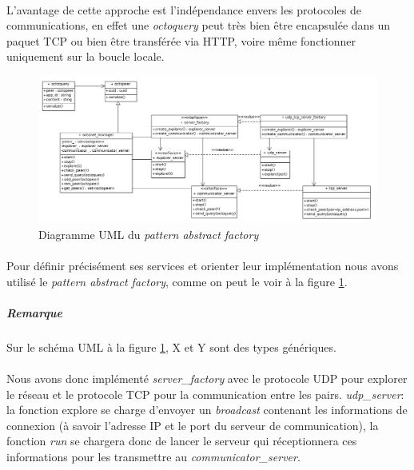 \documentclass[a4paper]{article}
\begin{document}
			\paragraph{}{
			L’avantage de cette approche est l’indépendance envers les protocoles de communications, en effet
			une \textit{octoquery} peut très bien être encapsulée dans un paquet TCP ou bien être transférée via HTTP,
			 voire même fonctionner uniquement sur la boucle locale.
			}
			\begin{figure}[!h]
					\centering
					\includegraphics[scale=0.4]{UML/octonet_factory1.png}
					\caption{\label{factory_uml} Diagramme UML du \textit{pattern abstract factory}}
			\end{figure}
						
			
			\paragraph{}{
			Pour définir précisément ses services et orienter leur implémentation nous avons utilisé le
			\textit{pattern abstract factory}, comme on peut le voir à la figure \ref{factory_uml}.
			}
				\subparagraph{Remarque}{Sur le schéma UML à la figure \ref{factory_uml}, X et Y sont des types génériques.}
				
			\paragraph{}{
			Nous avons donc implémenté \textit{server\_factory} avec le protocole UDP pour explorer le réseau et le
			protocole TCP pour la communication entre les pairs. \newline
			\textit{udp\_server}: la fonction explore se charge d’envoyer un \textit{broadcast} contenant les informations de
			connexion (à savoir l’adresse IP et le port du serveur de communication), la fonction \textit{run} 
			se chargera donc de lancer le serveur qui réceptionnera ces informations pour les
			transmettre au \textit{communicator\_server}.
			}
			
\end{document}
